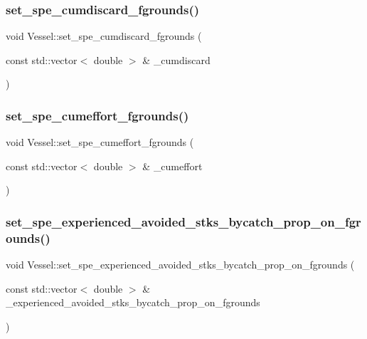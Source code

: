\subsubsection{\texorpdfstring{set\_spe\_cumdiscard\_fgrounds()}{set\_spe\_cumdiscard\_fgrounds()}}
{\footnotesize\ttfamily void Vessel\+::set\+\_\+spe\+\_\+cumdiscard\+\_\+fgrounds (\begin{DoxyParamCaption}\item[{const std\+::vector$<$ double $>$ \&}]{\+\_\+cumdiscard }\end{DoxyParamCaption})}

\mbox{\label{class_vessel_a9f08e3a540be7a3da0a600e6c4b3adcd}} 
\subsubsection{\texorpdfstring{set\_spe\_cumeffort\_fgrounds()}{set\_spe\_cumeffort\_fgrounds()}}
{\footnotesize\ttfamily void Vessel\+::set\+\_\+spe\+\_\+cumeffort\+\_\+fgrounds (\begin{DoxyParamCaption}\item[{const std\+::vector$<$ double $>$ \&}]{\+\_\+cumeffort }\end{DoxyParamCaption})}

\mbox{\label{class_vessel_acca1c6d05717bee9174e00000964e15b}} 
\subsubsection{\texorpdfstring{set\_spe\_experienced\_avoided\_stks\_bycatch\_prop\_on\_fgrounds()}{set\_spe\_experienced\_avoided\_stks\_bycatch\_prop\_on\_fgrounds()}}
{\footnotesize\ttfamily void Vessel\+::set\+\_\+spe\+\_\+experienced\+\_\+avoided\+\_\+stks\+\_\+bycatch\+\_\+prop\+\_\+on\+\_\+fgrounds (\begin{DoxyParamCaption}\item[{const std\+::vector$<$ double $>$ \&}]{\+\_\+experienced\+\_\+avoided\+\_\+stks\+\_\+bycatch\+\_\+prop\+\_\+on\+\_\+fgrounds }\end{DoxyParamCaption})}

